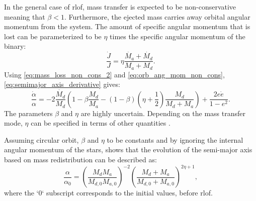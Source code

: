 In the general case of \ac{rlof}, mass transfer is expected to be non-conservative meaning that  $\beta < 1$. Furthermore,
the ejected mass carries away orbital angular momentum from the system. The amount of specific angular momentum that is lost can be parameterized to be $\eta$ times the specific angular momentum of the binary:
\begin{equation}\label{eq:orb_ang_mom_non_cons}
    \frac{\dot{J}}{J} = \eta \frac{\dot{M_{a}} + \dot{M_{d}}}{M_{a} + M_{d}}.
\end{equation}
Using \cref{eq:mass_loss_non_cons_2} and \cref{eq:orb_ang_mom_non_cons}, \cref{eq:semimajor_axis_derivative} gives:
\begin{equation}\label{eq:orb_ang_momen_derivative_non_cons}
    \frac{\dot{\alpha}}{\alpha}= -2\frac{\dot{M_{d}}}{M_{d}} \left( 1- \beta\frac{M_d}{M_a} - (1-\beta)(\eta + \frac{1}{2}) \frac{M_d}{M_d + M_a}  \right)  + \frac{2e \dot{e}}{1-e^2}.
\end{equation}  
The parameters $\beta$ and $\eta$ are highly uncertain. Depending on the mass transfer mode, $\eta$ can be specified in terms of other quantities \citep{postnov2014evolution}.

Assuming circular orbit, $\beta$ and $\eta$ to be constants and by ignoring the internal angular momentum of the stars, \cite{portegies1995formation} shows that the evolution of the semi-major axis based on mass redistribution can be described as:
\begin{equation}\label{eq:semimajor_axis_no_cons}
    \frac{\alpha}{\alpha_{0}} = \left (\frac{M_{d} M_{a}}{M_{d,0} M_{a,0}} \right)^{-2} \left (\frac{M_{d} + M_{a}}{M_{d,0}+M_{a,0}} \right)^{2\eta +1},
\end{equation}    
where the `0` subscript corresponds to the initial values, before \ac{rlof}.
    




